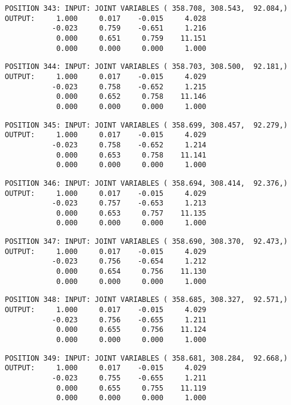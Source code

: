 \begin{verbatim}
POSITION 343: INPUT: JOINT VARIABLES ( 358.708, 308.543,  92.084,)
OUTPUT:     1.000     0.017    -0.015     4.028
           -0.023     0.759    -0.651     1.216
            0.000     0.651     0.759    11.151
            0.000     0.000     0.000     1.000
\end{verbatim} \pagebreak[1]\begin{verbatim}
POSITION 344: INPUT: JOINT VARIABLES ( 358.703, 308.500,  92.181,)
OUTPUT:     1.000     0.017    -0.015     4.029
           -0.023     0.758    -0.652     1.215
            0.000     0.652     0.758    11.146
            0.000     0.000     0.000     1.000
\end{verbatim} \pagebreak[1]\begin{verbatim}
POSITION 345: INPUT: JOINT VARIABLES ( 358.699, 308.457,  92.279,)
OUTPUT:     1.000     0.017    -0.015     4.029
           -0.023     0.758    -0.652     1.214
            0.000     0.653     0.758    11.141
            0.000     0.000     0.000     1.000
\end{verbatim} \pagebreak[1]\begin{verbatim}
POSITION 346: INPUT: JOINT VARIABLES ( 358.694, 308.414,  92.376,)
OUTPUT:     1.000     0.017    -0.015     4.029
           -0.023     0.757    -0.653     1.213
            0.000     0.653     0.757    11.135
            0.000     0.000     0.000     1.000
\end{verbatim} \pagebreak[1]\begin{verbatim}
POSITION 347: INPUT: JOINT VARIABLES ( 358.690, 308.370,  92.473,)
OUTPUT:     1.000     0.017    -0.015     4.029
           -0.023     0.756    -0.654     1.212
            0.000     0.654     0.756    11.130
            0.000     0.000     0.000     1.000
\end{verbatim} \pagebreak[1]\begin{verbatim}
POSITION 348: INPUT: JOINT VARIABLES ( 358.685, 308.327,  92.571,)
OUTPUT:     1.000     0.017    -0.015     4.029
           -0.023     0.756    -0.655     1.211
            0.000     0.655     0.756    11.124
            0.000     0.000     0.000     1.000
\end{verbatim} \pagebreak[1]\begin{verbatim}
POSITION 349: INPUT: JOINT VARIABLES ( 358.681, 308.284,  92.668,)
OUTPUT:     1.000     0.017    -0.015     4.029
           -0.023     0.755    -0.655     1.211
            0.000     0.655     0.755    11.119
            0.000     0.000     0.000     1.000
\end{verbatim} \pagebreak[1]\begin{verbatim}

\end{verbatim}
